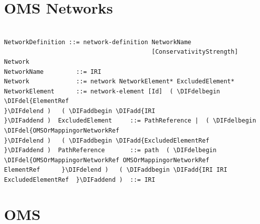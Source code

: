 \documentclass[10pt,fleqn,final]{scrreprt}
\makeatletter
\newcommand*{\eg}{e.g.\@\xspace}
\newcommand*\CommentAuthor{}
\renewcommand*\CommentAuthor{#1}}
\newcommand*\CommentDate{}
\renewcommand*\CommentDate{#1}}
\newcommand*\CommentId{}
\renewcommand*\CommentId{#1}}
\newcommand*\CommentType{}
\renewcommand*\CommentType{#1}}
\newcommand*{\SetCommentColorByType}[1]{%
\edef\localType{{#1}}%
\expandafter\ifstrequal\localType{q-aut}{\colorlet{CommentColor}{red}}{%
\expandafter\ifstrequal\localType{q-all}{\colorlet{CommentColor}{orange}}{%
\expandafter\ifstrequal\localType{todo}{\colorlet{CommentColor}{orange}}{%
\expandafter\ifstrequal\localType{fyi}{\colorlet{CommentColor}{lightgray}}{%
\colorlet{CommentColor}{yellow}}}}}}
\newcommand*{\SetCommentPrefixByType}[1]{%
\edef\localType{{#1}}%
\expandafter\@ifmtarg\localType{%
\edef\CommentPrefix{}%
}{%
\caseupper[q]{#1}%
\edef\CommentPrefix{\thestring: }%
}}
\newcommand*{\initComment}[1]{%
\setkeys{Comment}{#1}%
\SetCommentColorByType{\CommentType}%
\relax%
\SetCommentPrefixByType{\CommentType}%
\relax%
}
\newcommand*{\todonote}[2][]{%
\initComment{#1}%
\pdfcomment[author=\CommentAuthor,color=CommentColor,date=\CommentDate,id=\CommentId]{%
\CommentPrefix
#2}}
\renewcommand*{\todonote}[2][]{%
\initComment{#1}%
\ednote{\CommentPrefix #2}}
\renewcommand*{\textLF}{\\}
\newcommand{\sclause}[1]{\section{#1}}
\providecommand{\DIFadd}[1]{{\protect\color{blue}\uwave{#1}}} %
\providecommand{\DIFdel}[1]{{\protect\color{red}\sout{#1}}}                      %
\providecommand{\DIFaddbegin}{} %
\providecommand{\DIFaddend}{} %
\providecommand{\DIFdelbegin}{} %
\providecommand{\DIFdelend}{} %
\makeatother
\begin{document}


\sclause{OMS Networks}\label{a:networks}
\begin{lstlisting}[language=ebnf,escapeinside={()}]  % abstract syntax

NetworkDefinition ::= network-definition NetworkName
                                         [ConservativityStrength] Network
NetworkName         ::= IRI
Network             ::= network NetworkElement* ExcludedElement*
NetworkElement      ::= network-element [Id]  ( \DIFdelbegin \DIFdel{ElementRef
}\DIFdelend )   ( \DIFaddbegin \DIFadd{IRI
}\DIFaddend )  ExcludedElement     ::= PathReference |  ( \DIFdelbegin \DIFdel{OMSOrMappingorNetworkRef
}\DIFdelend )   ( \DIFaddbegin \DIFadd{ExcludedElementRef
}\DIFaddend )  PathReference       ::= path  ( \DIFdelbegin \DIFdel{OMSOrMappingorNetworkRef OMSOrMappingorNetworkRef
ElementRef      }\DIFdelend )   ( \DIFaddbegin \DIFadd{IRI IRI
ExcludedElementRef  }\DIFaddend )  ::= IRI
\end{lstlisting}



\sclause{OMS}
\end{document}
